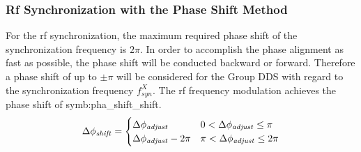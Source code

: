 \subsubsection{Rf Synchronization with the Phase Shift Method}

For the rf synchronization, the maximum required phase shift of the synchronization frequency is $2\pi$. In order to accomplish the phase alignment as fast as possible, the phase shift will be conducted backward or forward. Therefore a phase shift of up to $\pm \pi$ will be considered for the Group DDS with regard to the synchronization frequency $f_\mathit{syn}^X$. The rf frequency modulation achieves the phase shift of \gls{symb:pha_shift_shift}. 
\begin{eqnarray}\Delta \phi_\mathit{shift}=
\begin{cases} 


\Delta \phi_\mathit{adjust} & 0<\Delta \phi_\mathit{adjust}\le\pi \cr

\Delta \phi_\mathit{adjust} -2\pi &  \pi<\Delta \phi_\mathit{adjust}\le2\pi 


\label{phase_shift_eq}
\end{cases}
\end{eqnarray} 


